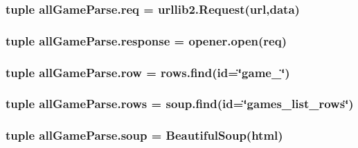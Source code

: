 \hypertarget{namespaceall_game_parse_a5bfed9efebbc641889b00e0505c4a4ae}{
\subsubsection[{req}]{\setlength{\rightskip}{0pt plus 5cm}tuple all\+Game\+Parse.\+req = urllib2.\+Request({\bf url},{\bf data})}}\label{namespaceall_game_parse_a5bfed9efebbc641889b00e0505c4a4ae}
\hypertarget{namespaceall_game_parse_a7bbf07843967c52d1d807c64b6d009d0}{
\subsubsection[{response}]{\setlength{\rightskip}{0pt plus 5cm}tuple all\+Game\+Parse.\+response = opener.\+open({\bf req})}}\label{namespaceall_game_parse_a7bbf07843967c52d1d807c64b6d009d0}
\hypertarget{namespaceall_game_parse_a2bdbbc305ed8beb518d32abaf8866039}{
\subsubsection[{row}]{\setlength{\rightskip}{0pt plus 5cm}tuple all\+Game\+Parse.\+row = rows.\+find(id=\char`\"{}game\+\_\char`\"{})}}\label{namespaceall_game_parse_a2bdbbc305ed8beb518d32abaf8866039}
\hypertarget{namespaceall_game_parse_a43d3a3e6df161dd6b906b25ba68e3f08}{
\subsubsection[{rows}]{\setlength{\rightskip}{0pt plus 5cm}tuple all\+Game\+Parse.\+rows = soup.\+find(id=\char`\"{}games\+\_\+list\+\_\+rows\char`\"{})}}\label{namespaceall_game_parse_a43d3a3e6df161dd6b906b25ba68e3f08}
\hypertarget{namespaceall_game_parse_a6b3a0dce9a39a129a40c94cf1bd1ee9b}{
\subsubsection[{soup}]{\setlength{\rightskip}{0pt plus 5cm}tuple all\+Game\+Parse.\+soup = Beautiful\+Soup({\bf html})}}\label{namespaceall_game_parse_a6b3a0dce9a39a129a40c94cf1bd1ee9b}
